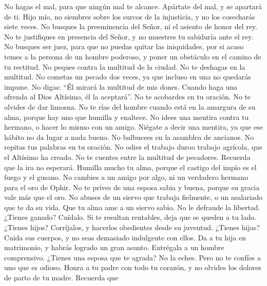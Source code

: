  No hagas el mal, para que ningún mal te alcance.
 Apártate del mal, y se apartará de ti. 
Hijo mío, no siembres sobre los surcos de la injusticia, y no los
cosecharás siete veces.  No busques la preeminencia del
Señor, ni el asiento de honor del rey.  No te justifiques
en presencia del Señor, y no muestres tu sabiduría ante el rey.
 No busques ser juez, para que no puedas quitar las
iniquidades, por si acaso temes a la persona de un hombre poderoso, y
poner un obstáculo en el camino de tu rectitud.  No peques
contra la multitud de la ciudad. No te deshagas en la multitud.
 No cometas un pecado dos veces, ya que incluso en una no
quedarás impune.  No digas: ``Él mirará la multitud de mis
dones. Cuando haga una ofrenda al Dios Altísimo, él la aceptará''.
 No te acobardes en tu oración. No te olvides de dar
limosna.  No te rías del hombre cuando está en la
amargura de su alma, porque hay uno que humilla y enaltece.
 No idees una mentira contra tu hermano, o hacer lo mismo
con un amigo.  Niégate a decir una mentira, ya que ese
hábito no da lugar a nada bueno.  No balbucees en la
asamblea de ancianos. No repitas tus palabras en tu oración.
 No odies el trabajo duroo trabajo agrícola, que el
Altísimo ha creado.  No te cuentes entre la multitud de
pecadores. Recuerda que la ira no esperará.  Humilla
mucho tu alma, porque el castigo del impío es el fuego y el gusano.
 No cambies a un amigo por algo, ni un verdadero hermano
para el oro de Ophir.  No te prives de una esposa sabia y
buena, porque su gracia vale más que el oro.  No abuses
de un siervo que trabaja fielmente, o un asalariado que te da su vida.
 Que tu alma ame a un siervo sabio. No le defraude la
libertad.  ¿Tienes ganado? Cuídalo. Si te resultan
rentables, deja que se queden a tu lado.  ¿Tienes hijos?
Corríjalos, y hacerlos obedientes desde su juventud. 
¿Tienes hijas? Cuida sus cuerpos, y no seas demasiado indulgente con
ellos.  Da a tu hija en matrimonio, y habrás logrado un
gran asunto. Entrégala a un hombre comprensivo.  ¿Tienes
una esposa que te agrada? No la eches. Pero no te confíes a uno que es
odioso.  Honra a tu padre con todo tu corazón, y no
olvides los dolores de parto de tu madre.  Recuerda que

